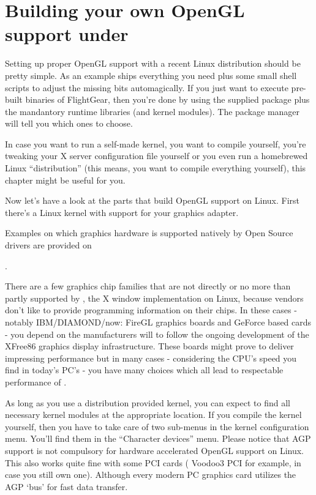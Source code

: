 \section{Building your own OpenGL support under \label{ownopengl}}

Setting up proper OpenGL support with a recent Linux
distribution should be pretty simple. As an example  ships
everything you need plus some small shell scripts to adjust the missing bits
automagically. If you just want to execute pre-built binaries of FlightGear,
then you're done by using the supplied \FlightGear{} package plus the
mandantory runtime libraries (and kernel modules). The package manager will
tell you which ones to choose.

In case you want to run a self-made kernel, you want to compile
\FlightGear{} yourself, you're tweaking your X server configuration file
yourself or you even run a homebrewed Linux ``distribution'' (this means,
you want to compile everything yourself), this chapter might be useful for
you.

Now let's have a look at the parts that build OpenGL support on Linux. First
there's a Linux kernel with support for your graphics adapter.

Examples on which graphics hardware is supported natively by Open Source
drivers are provided on
\medskip

\noindent
{}.
\medskip

There are a few graphics chip families that are not directly or no more than
partly supported by , the X window implementation on Linux,
because vendors don't like to provide programming information on their
chips. In these cases - notably IBM/DIAMOND/now:  FireGL graphics
boards and  GeForce based cards - you depend on the
manufacturers will to follow the ongoing development of the XFree86 graphics
display infrastructure. These boards might prove to deliver impressing
performance but in many cases - considering the CPU's speed you find in
today's PC's - you have many choices which all lead to respectable
performance of \FlightGear{}.

As long as you use a distribution provided kernel, you can expect to find
all necessary kernel modules at the appropriate location. If you compile the
kernel yourself, then you have to take care of two sub-menus in the kernel
configuration menu. You'll find them in the ``Character devices'' menu.
Please notice that AGP support is not compulsory for hardware accelerated
OpenGL support on Linux. This also works quite fine with some PCI cards
( Voodoo3 PCI for example, in case you still own one). Although
every modern PC graphics card utilizes the AGP `bus' for fast data transfer.

